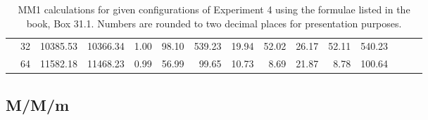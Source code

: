 \begin{table}
{\begin{tabular}{lllrrrrrrrrrrrr}
                            & 32 & 10385.53 & 10366.34  & 1.00   & 98.10  & 539.23 & 19.94 & 52.02 & 26.17 & 52.11 & 540.23  \\
                            & 64 & 11582.18 & 11468.23  & 0.99   & 56.99  & 99.65  & 10.73 & 8.69  & 21.87 & 8.78  & 100.64  \\
                    \bottomrule
                \end{tabular}
                \caption{MM1 calculations for given configurations of Experiment 4 using the formulae listed in
                         the book, Box 31.1. Numbers are rounded to two decimal places for presentation
                         purposes.\label{tab:7_mm1}}
            }
        \end{table}

        \subsection{M/M/m\label{subsec:7_mmm}}

